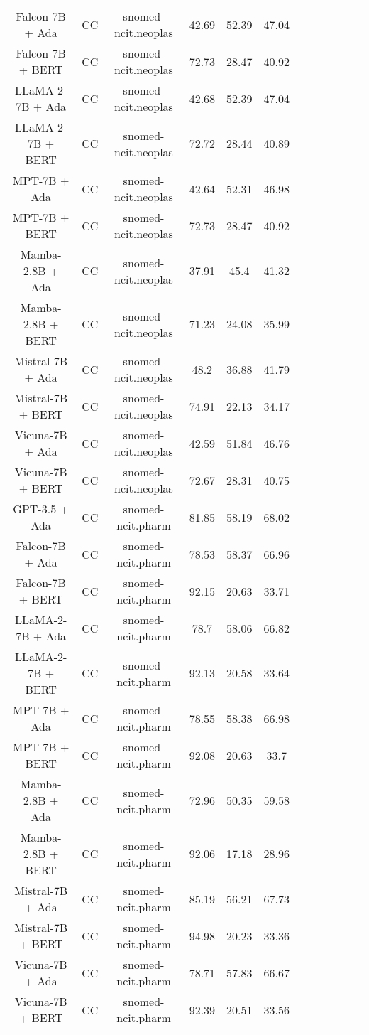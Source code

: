 \begin{table}
\begin{tabular}{|c|c|c|c|c|c|c|c|c|c|c|c|}
	Falcon-7B + Ada  & CC & snomed-ncit.neoplas  &  42.69 &  52.39 & 47.04  \\
	Falcon-7B + BERT  & CC & snomed-ncit.neoplas  &  72.73 &  28.47 & 40.92  \\
	LLaMA-2-7B + Ada  & CC & snomed-ncit.neoplas  &  42.68 &  52.39 & 47.04  \\
	LLaMA-2-7B + BERT  & CC & snomed-ncit.neoplas  &  72.72 &  28.44 & 40.89  \\
	MPT-7B + Ada  & CC & snomed-ncit.neoplas  &  42.64 &  52.31 & 46.98  \\
	MPT-7B + BERT  & CC & snomed-ncit.neoplas  &  72.73 &  28.47 & 40.92  \\
	Mamba-2.8B + Ada  & CC & snomed-ncit.neoplas  &  37.91 &  45.4 & 41.32  \\
	Mamba-2.8B + BERT  & CC & snomed-ncit.neoplas  &  71.23 &  24.08 & 35.99  \\
	Mistral-7B + Ada  & CC & snomed-ncit.neoplas  &  48.2 &  36.88 & 41.79  \\
	Mistral-7B + BERT  & CC & snomed-ncit.neoplas  &  74.91 &  22.13 & 34.17  \\
	Vicuna-7B + Ada  & CC & snomed-ncit.neoplas  &  42.59 &  51.84 & 46.76  \\
	Vicuna-7B + BERT  & CC & snomed-ncit.neoplas  &  72.67 &  28.31 & 40.75  \\
	\hline
	GPT-3.5 + Ada  & CC & snomed-ncit.pharm  &  81.85 &  58.19 & 68.02  \\
	Falcon-7B + Ada  & CC & snomed-ncit.pharm  &  78.53 &  58.37 & 66.96  \\
	Falcon-7B + BERT  & CC & snomed-ncit.pharm  &  92.15 &  20.63 & 33.71  \\
	LLaMA-2-7B + Ada  & CC & snomed-ncit.pharm  &  78.7 &  58.06 & 66.82  \\
	LLaMA-2-7B + BERT  & CC & snomed-ncit.pharm  &  92.13 &  20.58 & 33.64  \\
	MPT-7B + Ada  & CC & snomed-ncit.pharm  &  78.55 &  58.38 & 66.98  \\
	MPT-7B + BERT  & CC & snomed-ncit.pharm  &  92.08 &  20.63 & 33.7  \\
	Mamba-2.8B + Ada  & CC & snomed-ncit.pharm  &  72.96 &  50.35 & 59.58  \\
	Mamba-2.8B + BERT  & CC & snomed-ncit.pharm  &  92.06 &  17.18 & 28.96  \\
	Mistral-7B + Ada  & CC & snomed-ncit.pharm  &  85.19 &  56.21 & 67.73  \\
	Mistral-7B + BERT  & CC & snomed-ncit.pharm  &  94.98 &  20.23 & 33.36  \\
	Vicuna-7B + Ada  & CC & snomed-ncit.pharm  &  78.71 &  57.83 & 66.67  \\
	Vicuna-7B + BERT  & CC & snomed-ncit.pharm  &  92.39 &  20.51 & 33.56  \\
	\hline
\end{tabular}
    \end{table}








